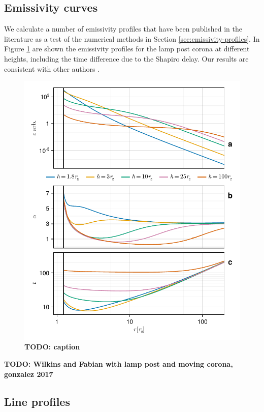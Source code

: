 \documentclass[fleqn,usenatbib]{mnras}
\newcommand{\todo}[1]{{\noindent \bf \color{red} TODO: #1}}
\begin{document}
\subsection{Emissivity curves}

We calculate a number of emissivity profiles that have been published in the literature as a test of the numerical methods in Section \ref{sec:emissivity-profiles}. In Figure \ref{fig:emissivity-profiles} are shown the emissivity profiles for the lamp post corona at different heights, including the time difference due to the Shapiro delay. Our results are consistent with other authors \citep{wilkins_understanding_2012,dauser_irradiation_2013}.

\begin{figure}
	\centering
	\includegraphics[width=0.99\linewidth]{figures/emissivity.point-source.pdf}
	\caption{\todo{caption}}
	\label{fig:emissivity-profiles}
\end{figure}

\todo{Wilkins and Fabian with lamp post and moving corona, gonzalez 2017}

\subsection{Line profiles}
\end{document}
